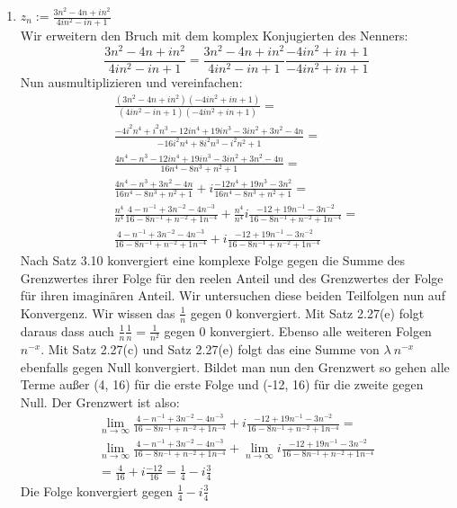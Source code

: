 \documentclass{article}
\begin{document}
\begin{enumerate}[ label = (\alph*) ]
\begin{enumerate}[ label = (\roman*) ]
            \item \(z_n := \frac{ 3n^2 - 4n + in^2 }{ 4in^2 -in + 1 } \) \\
            Wir erweitern den Bruch mit dem komplex Konjugierten des Nenners:
            \[ \frac{ 3n^2 - 4n + in^2 }{ 4in^2 -in + 1 } = \frac{ 3n^2 - 4n + in^2 }{ 4in^2 -in + 1 } \frac{ -4in^2 +in + 1 }{ -4in^2 +in + 1 } \]
            Nun ausmultiplizieren und vereinfachen:
            \begin{gather*}
                \frac{ (3n^2 - 4n + in^2) (-4in^2 +in + 1) }{ (4in^2 -in + 1) (-4in^2 +in + 1) } = \\
                \frac{ -4 i^2 n^4 + i^2 n^3 - 12 i n^4 + 19i n^3 - 3 i n^2 + 3 n^2 - 4 n }{ - 16 i^{2} n^{4} + 8 i^{2} n^{3} - i^{2} n^{2} + 1 } = \\
                \frac{ 4 n^4 - n^3 - 12 i n^4 + 19i n^3 - 3 i n^2 + 3 n^2 - 4 n }{ 16 n^4 - 8 n^3 + n^2 + 1 } = \\
                \frac{ 4 n^4 - n^3 + 3 n^2 - 4n }{16 n^4 - 8 n^3 + n^2 + 1} + i\frac{ -12 n^4 +19 n^3 -3n^2}{16 n^4 - 8 n^3 + n^2 + 1} = \\
                \frac{n^4}{n^4} \frac{ 4 - n^{-1} + 3 n^{-2} - 4n^{-3} }{16 - 8 n^{-1} + n^{-2} + 1n^{-4} } 
                    + \frac{n^4}{n^4} i\frac{ -12 + 19 n^{-1} -3n^{-2} }{16 - 8 n^{-1} + n^{-2} + 1 n^{-4}} = \\
                \frac{ 4 - n^{-1} + 3 n^{-2} - 4n^{-3} }{16 - 8 n^{-1} + n^{-2} + 1n^{-4} } 
                    + i\frac{ -12 + 19 n^{-1} -3n^{-2} }{16 - 8 n^{-1} + n^{-2} + 1 n^{-4}}
            \end{gather*}
            Nach Satz 3.10 konvergiert eine komplexe Folge gegen die Summe des Grenzwertes ihrer Folge für den reelen Anteil
            und des Grenzwertes der Folge für ihren imaginären Anteil. Wir untersuchen diese beiden Teilfolgen nun auf Konvergenz.
            Wir wissen das \(\frac{1}{n}\) gegen 0 konvergiert. Mit Satz 2.27(e) folgt daraus dass auch \(\frac{1}{n} \frac{1}{n} = \frac{1}{n^2}\) gegen 0 konvergiert.
            Ebenso alle weiteren Folgen \(n^{-x}\). Mit Satz 2.27(c) und Satz 2.27(e) folgt das eine Summe von \(\lambda \: n^{-x}\) ebenfalls gegen Null konvergiert.
            Bildet man nun den Grenzwert so gehen alle Terme außer (4, 16) für die erste Folge und (-12, 16) für die zweite gegen Null. Der Grenzwert ist also:
            \begin{gather*}
                \lim_{n \to \infty} \frac{ 4 - n^{-1} + 3 n^{-2} - 4n^{-3} }{16 - 8 n^{-1} + n^{-2} + 1n^{-4} }
                + i\frac{ -12 + 19 n^{-1} -3n^{-2} }{16 - 8 n^{-1} + n^{-2} + 1 n^{-4}} = \\ 
                \lim_{n \to \infty} \frac{ 4 - n^{-1} + 3 n^{-2} - 4n^{-3} }{16 - 8 n^{-1} + n^{-2} + 1n^{-4} }
                + \lim_{n \to \infty} i\frac{ -12 + 19 n^{-1} -3n^{-2} }{16 - 8 n^{-1} + n^{-2} + 1 n^{-4}} \\ 
                = \frac{4}{16} + i\frac{-12}{16} = \frac{1}{4} - i\frac{3}{4}
            \end{gather*}
            Die Folge konvergiert gegen \(\frac{1}{4} - i\frac{3}{4}\)


\end{enumerate}
\end{enumerate}
\end{document}
